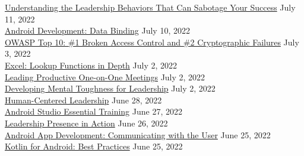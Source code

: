 \documentclass[10pt]{res} %
\begin{document}
\begin{resume}
\href{https://www.linkedin.com/learning/certificates/9af7fd427c09f6add9ec85ba7d5da51e49107f1481275716d01fd7719a844c8f}{\color{blue}Understanding the Leadership Behaviors That Can Sabotage Your Success} \hfill July 11, 2022 \\
\href{https://www.linkedin.com/learning/certificates/6e69fd6ee34bd4ba34a47fb28e8b4c2c9d04e8f790328f76c72fb472e1994eec}{\color{blue}Android Development: Data Binding} \hfill July 10, 2022 \\
\href{https://www.linkedin.com/learning/certificates/d1f5e03c48d25fd2feb458d4a33ca8c4037f3cfad2c0cb3160e7a4aefe575d82}{\color{blue}OWASP Top 10: \#1 Broken Access Control and \#2 Cryptographic Failures} \hfill July 3, 2022 \\
\href{https://www.linkedin.com/learning/certificates/d2c70e14607f6dd8b97e3c6145cb80133deb08a2043ee46d25af5a517a6be4b0}{\color{blue}Excel: Lookup Functions in Depth} \hfill July 2, 2022 \\
\href{https://www.linkedin.com/learning/certificates/80715a17e4ec03d92989d3f4ec54f27480210165942a23a7b8c9a1f956b80938}{\color{blue}Leading Productive One-on-One Meetings} \hfill July 2, 2022 \\
\href{https://www.linkedin.com/learning/certificates/d54099f26495b25df6eadd1e3eaa7e0394bf660c73e9f41bef2dcd4b12c9e317}{\color{blue}Developing Mental Toughness for Leadership} \hfill July 2, 2022 \\
\href{https://www.linkedin.com/learning/certificates/a262aa4f79791dbd1738eab185803bb6d582eb1f3a96ce4df93143082f2bb2e3}{\color{blue}Human-Centered Leadership} \hfill June 28, 2022 \\
\href{https://www.linkedin.com/learning/certificates/38022f0fe871d96da9831352fa710ada7bf86f2fdfdaf1b9d27752bf90011ec3}{\color{blue}Android Studio Essential Training} \hfill June 27, 2022 \\
\href{https://www.linkedin.com/learning/certificates/de3235f66971bbd63ff333818fc8e60ec621f2e10570873bf6f2bb1101f18ac9}{\color{blue}Leadership Presence in Action} \hfill June 26, 2022 \\
\href{https://www.linkedin.com/learning/certificates/29b9d643dbd5b5bd1c26910910286c5d373353e3a55268942113662652a5b6e3}{\color{blue}Android App Development: Communicating with the User} \hfill June 25, 2022 \\
\href{https://www.linkedin.com/learning/certificates/d6ef90fa4d709b38fd10c33e9dc310e826be01d2269139b4267b62a38aaf1a53}{\color{blue}Kotlin for Android: Best Practices} \hfill June 25, 2022 \\

\end{resume}
\end{document}
